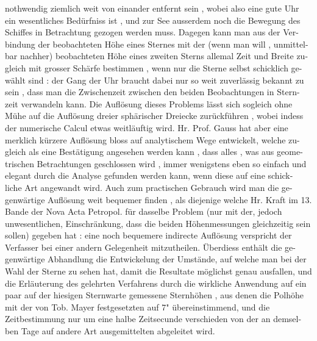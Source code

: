 \documentclass[12pt,a4paper]{article}
\begin{document}
\newpage

nothwendig  ziemlich  weit  von  einander  entfernt  sein ,  wobei  also  eine  gute  Uhr
ein  wesentliches  Bedürfniss  ist ,  und  zur  See  ausserdem  noch  die  Bewegung  des
Schiffes  in  Betrachtung  gezogen  werden  muss.  Dagegen  kann  man  aus  der  Ver-
bindung der  beobachteten  Höhe  eines  Sternes  mit  der  (wenn  man  will ,  unmittel-
bar nachher)  beobachteten  Höhe  eines  zweiten  Sterns  allemal  Zeit  und  Breite  zu-
gleich mit  grosser  Schärfe  bestimmen ,  wenn  nur  die  Sterne  selbst  schicklich  ge-
wählt sind :  der  Gang  der  Uhr  braucht  dabei  nur  so  weit  zuverlässig  bekannt  zu
sein ,  dass  man  die  Zwischenzeit  zwischen  den  beiden  Beobachtungen  in  Stern-
zeit verwandeln  kann.  Die  Auflösung  dieses  Problems  lässt  sich  sogleich  ohne
Mühe  auf  die  Auflösung  dreier  sphärischer  Dreiecke  zurückführen ,  wobei  indess
der  numerische  Calcul  etwas  weitläuftig  wird.  Hr.  Prof.  Gauss  hat  aber  eine
merklich  kürzere  Auflösung  bloss  auf  analytischem  Wege  entwickelt,  welche  zu-
gleich als  eine  Bestätigung  angesehen  werden  kann ,  dass  alles ,  was  aus  geome-
trischen Betrachtungen  geschlossen  wird ,  immer  wenigstens  eben  so  einfach  und
elegant  durch  die  Analyse  gefunden  werden  kann,  wenn  diese  auf  eine  schick-
liche Art  angewandt  wird.  Auch  zum  practischen  Gebrauch  wird  man  die  ge-
genwärtige Auflösung  weit  bequemer  finden ,  als  diejenige  welche  Hr.  Kraft  im
13.  Bande  der  Nova  Acta  Petropol.  für  dasselbe  Problem  (nur  mit  der,  jedoch
unwesentlichen,  Einschränkung,  dass  die  beiden  Höhenmessungen  gleichzeitig
sein  sollen)  gegeben  hat :  eine  noch  bequemere  indirecte  Auflösung  verspricht  der
Verfasser  bei  einer  andern  Gelegenheit  mitzutheilen.  Überdiess  enthält  die  ge-
genwärtige Abhandlung  die  Entwickelung  der  Umstände,  auf  welche  man  bei  der
Wahl  der  Sterne  zu  sehen  hat,  damit  die  Resultate  möglichst  genau  ausfallen,
und  die  Erläuterung  des  gelehrten  Verfahrens  durch  die  wirkliche  Anwendung
auf  ein  paar  auf  der  hiesigen  Sternwarte  gemessene  Sternhöhen ,  aus  denen  die
Polhöhe  mit  der  von  Tob.  Mayer  festgesetzten  auf  7"  übereinstimmend,  und  die
Zeitbestimmung  nur  um  eine  halbe  Zeitsecunde  verschieden  von  der  an  demsel-
ben Tage  auf  andere  Art  ausgemittelten  abgeleitet  wird.

\newpage
\end{document}

